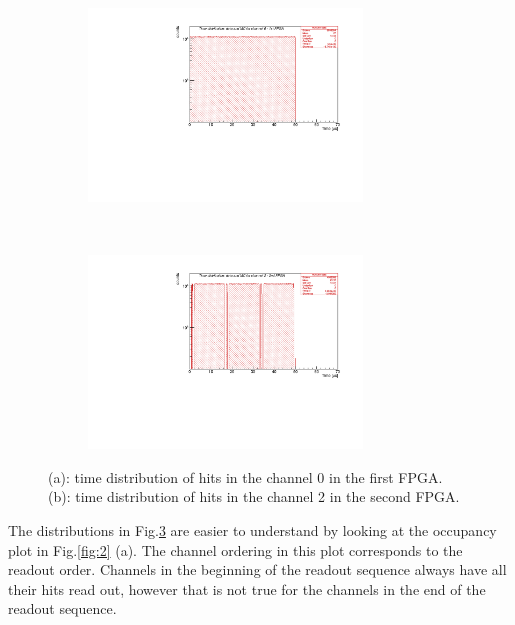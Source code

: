 \begin{figure}[!h]
  \begin{subfigure}[b]{\textwidth}
      \centering
      \includegraphics[width=0.8\textwidth]{figures/pdf/figure_00007_timedistr_roc_simulation_ch0_281.pdf}
      \caption{}
      \label{fig:t1}
  \end{subfigure}
\\
  \begin{subfigure}[b]{\textwidth}
      \centering
      \includegraphics[width=0.8\textwidth]{figures/pdf/figure_00003_timedistr_roc_simulation_ch2_281.pdf}
      \caption{}
      \label{fig:t2}
  \end{subfigure}
     \caption{(a): time distribution of hits in the channel 0 in the first FPGA. \\
     (b): time distribution of hits in the channel 2 in the second FPGA.}
     \label{fig:1}
\end{figure}

    

The distributions in Fig.\ref{fig:1} are easier to understand by looking at the occupancy plot in Fig.\ref{fig:2} (a).
The channel ordering in this plot corresponds to the readout order.
Channels in the beginning of the readout sequence always have all their hits read out,
  however that is not true for the channels in the end of the readout sequence.


